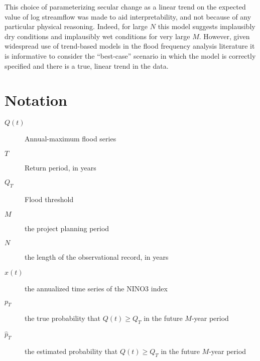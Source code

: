 \documentclass[12pt]{article}
\begin{document}
This choice of parameterizing secular change as a linear trend on the expected value of log streamflow was made to aid interpretability, and not because of any particular physical reasoning.
Indeed, for large $N$ this model suggests implausibly dry conditions and implausibly wet conditions for very large $M$.
However, given widespread use of trend-based models in the flood frequency analysis literature it is informative to consider the ``best-case'' scenario in which the model is correctly specified and there is a true, linear trend in the data.

\section{Notation}

\begin{description}
  \item[\( Q(t) \)] Annual-maximum flood series
  \item[\( T \)] Return period, in years
  \item[\( Q_T \)] Flood threshold
  \item[\( M \)] the project planning period
  \item[\( N \)] the length of the observational record, in years
  \item[\( x(t) \)] the annualized time series of the NINO3 index
  \item[\( p_T \)] the true probability that \( Q(t) \geq Q_T \) in the future $M$-year period
  \item[\( \hat{p}_T \)] the estimated probability that \( Q(t) \geq Q_T \) in the future $M$-year period
\end{description}

\printbibliography{}
\end{document}
